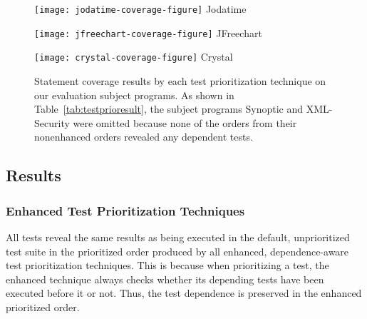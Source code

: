 \begin{figure}[t]
\begin{minipage}[b]{\linewidth}
\centering
\texttt{[image: jodatime-coverage-figure]}
Jodatime
\end{minipage}
\begin{minipage}[b]{\linewidth}
\centering
\texttt{[image: jfreechart-coverage-figure]}
JFreechart
\end{minipage}
\begin{minipage}[b]{\linewidth}
\centering
\texttt{[image: crystal-coverage-figure]}
{Crystal}
\end{minipage}
\vspace{-6mm}
\caption{
    \label{fig:priocoverage}
Statement coverage results by each test prioritization technique on
our evaluation subject programs.
As shown in Table~\ref{tab:testprioresult}, the subject programs Synoptic
and XML-Security were omitted because none of the orders from their
nonenhanced orders revealed any dependent tests.
}
\end{figure}


\subsection{Results}


\subsubsection{Enhanced Test Prioritization Techniques}

All tests reveal the same results as being executed
in the default, unprioritized test suite in the prioritized
order produced by all enhanced, dependence-aware test
prioritization techniques. This is because when prioritizing
a test, the enhanced technique always checks whether
its depending tests have been executed before it or not. Thus,
the test dependence is preserved in the enhanced prioritized order.

